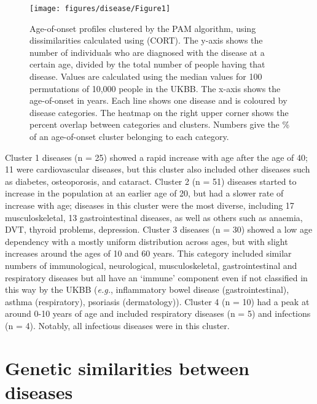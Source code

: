 \documentclass[12pt,twoside]{unicam}
\begin{document}
\begin{figure}

{\centering \texttt{[image: figures/disease/Figure1]} 

}

\caption[Age-of-onset clusters.]{Age-of-onset profiles clustered by the PAM algorithm, using dissimilarities calculated using (CORT). The y-axis shows the number of individuals who are diagnosed with the disease at a certain age, divided by the total number of people having that disease. Values are calculated using the median values for 100 permutations of 10,000 people in the UKBB. The x-axis shows the age-of-onset in years. Each line shows one disease and is coloured by disease categories. The heatmap on the right upper corner shows the percent overlap between categories and clusters. Numbers give the \% of an age-of-onset cluster belonging to each category.}\label{fig:disFig1}
\end{figure}

Cluster 1 diseases (n = 25) showed a rapid increase with age after the age of 40; 11 were cardiovascular diseases, but this cluster also included other diseases such as diabetes, osteoporosis, and cataract. Cluster 2 (n = 51) diseases started to increase in the population at an earlier age of 20, but had a slower rate of increase with age; diseases in this cluster were the most diverse, including 17 musculoskeletal, 13 gastrointestinal diseases, as well as others such as anaemia, DVT, thyroid problems, depression. Cluster 3 diseases (n = 30) showed a low age dependency with a mostly uniform distribution across ages, but with slight increases around the ages of 10 and 60 years. This category included similar numbers of immunological, neurological, musculoskeletal, gastrointestinal and respiratory diseases but all have an `immune' component even if not classified in this way by the UKBB (\emph{e.g.}, inflammatory bowel disease (gastrointestinal), asthma (respiratory), psoriasis (dermatology)). Cluster 4 (n = 10) had a peak at around 0-10 years of age and included respiratory diseases (n = 5) and infections (n = 4). Notably, all infectious diseases were in this cluster.

\hypertarget{genetic-similarities-between-diseases}{%
\section{Genetic similarities between diseases}\label{genetic-similarities-between-diseases}}
\end{document}
